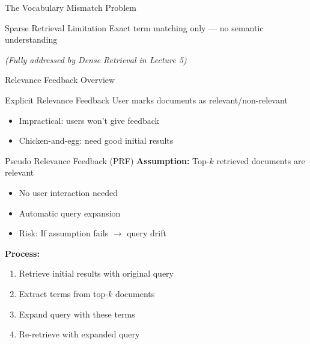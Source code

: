 \documentclass[aspectratio=169]{beamer}
\newif\ifanimated
\newcommand{\cpause}{\ifanimated\pause\fi}
\begin{document}
\begin{frame}{The Vocabulary Mismatch Problem}
\vspace{1em}

\begin{alertblock}{Sparse Retrieval Limitation}
Exact term matching only --- no semantic understanding
\end{alertblock}

\vspace{0.5em}

\textit{(Fully addressed by Dense Retrieval in Lecture 5)}
\end{frame}

\begin{frame}[shrink=25]{Relevance Feedback Overview}
\begin{block}{Explicit Relevance Feedback}
User marks documents as relevant/non-relevant
\cpause
\begin{itemize}
    \item \textcolor{red}{} Impractical: users won't give feedback
    \item \textcolor{red}{} Chicken-and-egg: need good initial results
\end{itemize}\cpause
\end{block}

\vspace{1em}

\begin{block}{Pseudo Relevance Feedback (PRF)}
\textbf{Assumption:} Top-$k$ retrieved documents are relevant
\begin{itemize}
    \item \textcolor{green}{\checkmark} No user interaction needed
    \item \textcolor{green}{\checkmark} Automatic query expansion
    \item \textcolor{red}{} Risk: If assumption fails $\rightarrow$ query drift
\end{itemize}\cpause
\end{block}

\vspace{1em}

\textbf{Process:}
\begin{enumerate}
    \item Retrieve initial results with original query
    \item Extract terms from top-$k$ documents
    \item Expand query with these terms
    \item Re-retrieve with expanded query
\end{enumerate}
\end{frame}
\end{document}
